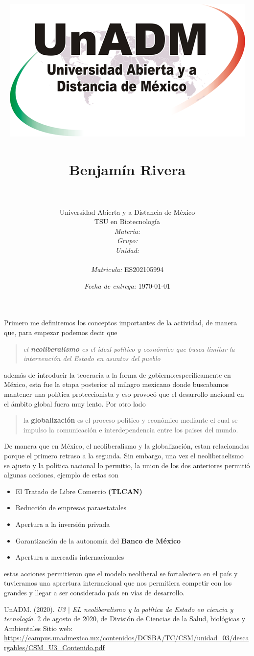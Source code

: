 \documentclass[12pt]{article}
\title{
	\includegraphics{../../../assets/logo-unadm} \\
	\ \\ Benjam\'in Rivera \\
	\bf{\titulo}\\}
\author{
	Universidad Abierta y a Distancia de México \\
	TSU en Biotecnolog\'ia \\
	\textit{Materia:} \materia \\
	\textit{Grupo:} \grupo \\
	\textit{Unidad:} \unidad \\
	\\
	\textit{Matricula:} ES202105994 }
\date{\textit{Fecha de entrega:} \today}
\begin{document}
\maketitle
\noindent\makebox[\linewidth]{\rule{\paperwidth}{0.4pt}}

	\par Primero me definiremos los conceptos importantes de la actividad, de manera que, para empezar podemos decir que
	\begin{quote}\it
		el \textbf{neoliberalismo} es el ideal político y económico que busca limitar la intervención del Estado en asuntos del pueblo
	\end{quote}
	además de introducir la teocracia a la forma de gobierno;especificamente en México, esta fue la etapa posterior al milagro mexicano donde buscabamos mantener una política proteccionista y eso provocó que el desarrollo nacional en el ámbito global fuera muy lento. Por otro lado
	\begin{quote}
		la \textbf{globalización} es el proceso político y económico mediante el cual se impulso la comunicación e interdependencia entre los paises del mundo.
	\end{quote}
	
	\par De manera que en México, el neoliberalismo y la globalización, estan relacionadas porque el primero retraso a la segunda. Sin embargo, una vez el neoliberaelismo se ajusto y la política nacional lo permitio, la union de los dos anteriores permitió algunas acciones, ejemplo de estas son
	\begin{itemize}
		\item El Tratado de Libre Comercio \textbf{(TLCAN)}
		\item Reducci\'on de empresas paraestatales
		\item Apertura a la inversi\'on privada
		\item Garantizaci\'on de la autonom\'ia del \textbf{Banco de M\'exico}
		\item Apertura a mercadis internacionales
	\end{itemize}
	estas acciones permitieron que el modelo neoliberal se fortaleciera en el país y tuvieramos una aprertura internacional que nos permitiera competir con los grandes y llegar a ser considerado país en vías de desarrollo.
	
	

\noindent\makebox[\linewidth]{\rule{\paperwidth}{0.4pt}}
\begin{thebibliography}{X}
	 UnADM. (2020). \textit{U3 $|$ EL neoliberalismo y la política de Estado en ciencia y tecnología}. 2 de agosto de 2020, de División de Ciencias de la Salud, biológicas y Ambientales Sitio web: \url{https://campus.unadmexico.mx/contenidos/DCSBA/TC/CSM/unidad_03/descargables/CSM_U3_Contenido.pdf}
\end{thebibliography}
\end{document}
